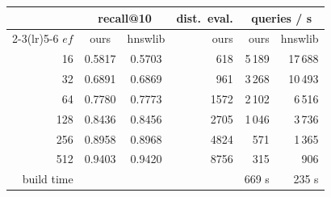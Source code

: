 \begin{tabular}{r cc r rr}
\toprule
 & \multicolumn{2}{c}{recall@10} & dist.\ eval. & \multicolumn{2}{c}{queries / s}\\
\cmidrule(lr){2-3}\cmidrule(lr){5-6}
$ef$ & ours & hnswlib & ours & ours & hnswlib\\
\midrule
16 & 0.5817 & 0.5703 & 618 & 5\,189 & 17\,688\\
32 & 0.6891 & 0.6869 & 961 & 3\,268 & 10\,493\\
64 & 0.7780 & 0.7773 & 1572 & 2\,102 & 6\,516\\
128 & 0.8436 & 0.8456 & 2705 & 1\,046 & 3\,736\\
256 & 0.8958 & 0.8968 & 4824 & 571 & 1\,365\\
512 & 0.9403 & 0.9420 & 8756 & 315 & 906\\
\midrule
build time & \multicolumn{2}{c}{} & & 669 s & 235 s\\
\bottomrule
\end{tabular}
